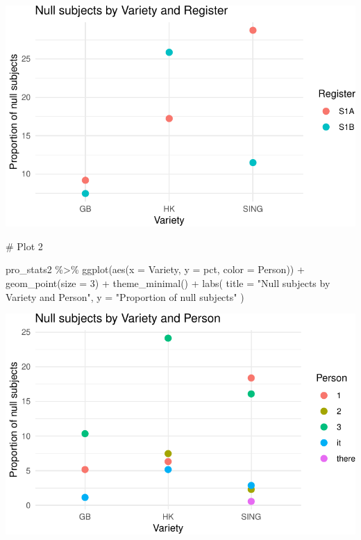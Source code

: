 \documentclass[
  11pt,
  letterpaper,
  DIV=11,
  numbers=noendperiod]{scrreprt}
\newenvironment{Shaded}{\begin{snugshade}}{\end{snugshade}}
\newcommand{\AttributeTok}[1]{\textcolor[rgb]{0.40,0.45,0.13}{#1}}
\newcommand{\CommentTok}[1]{\textcolor[rgb]{0.37,0.37,0.37}{#1}}
\newcommand{\DecValTok}[1]{\textcolor[rgb]{0.68,0.00,0.00}{#1}}
\newcommand{\FunctionTok}[1]{\textcolor[rgb]{0.28,0.35,0.67}{#1}}
\newcommand{\NormalTok}[1]{\textcolor[rgb]{0.00,0.23,0.31}{#1}}
\newcommand{\SpecialCharTok}[1]{\textcolor[rgb]{0.37,0.37,0.37}{#1}}
\newcommand{\StringTok}[1]{\textcolor[rgb]{0.13,0.47,0.30}{#1}}
\begin{document}
\includegraphics{Logistic_regression_files/figure-pdf/unnamed-chunk-4-1.pdf}

\begin{Shaded}
\begin{Highlighting}[]
\CommentTok{\# Plot 2}

\NormalTok{pro\_stats2 }\SpecialCharTok{\%\textgreater{}\%}
  \FunctionTok{ggplot}\NormalTok{(}\FunctionTok{aes}\NormalTok{(}\AttributeTok{x =}\NormalTok{ Variety, }\AttributeTok{y =}\NormalTok{ pct, }\AttributeTok{color =}\NormalTok{ Person)) }\SpecialCharTok{+}
  \FunctionTok{geom\_point}\NormalTok{(}\AttributeTok{size =} \DecValTok{3}\NormalTok{) }\SpecialCharTok{+}
  \FunctionTok{theme\_minimal}\NormalTok{() }\SpecialCharTok{+}
  \FunctionTok{labs}\NormalTok{(}
    \AttributeTok{title =} \StringTok{"Null subjects by Variety and Person"}\NormalTok{,}
    \AttributeTok{y =} \StringTok{"Proportion of null subjects"}
\NormalTok{  )}
\end{Highlighting}
\end{Shaded}

\includegraphics{Logistic_regression_files/figure-pdf/unnamed-chunk-4-2.pdf}
\end{document}
